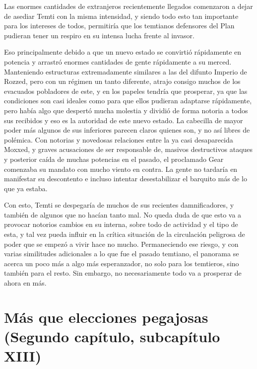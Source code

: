 \documentclass[
  spanish,
]{book}
\begin{document}
Las enormes cantidades de extranjeros recientemente llegados comenzaron a dejar de asediar Temti con la misma intensidad, y siendo todo esto tan importante para los intereses de todos, permitiría que los temtianos defensores del Plan pudieran tener un respiro en su intensa lucha frente al invasor.

Eso principalmente debido a que un nuevo estado se convirtió rápidamente en potencia y arrastró enormes cantidades de gente rápidamente a su merced. Manteniendo estructuras extremadamente similares a las del difunto Imperio de Rozzed, pero con un régimen un tanto diferente, atrajo consigo muchos de los evacuados pobladores de este, y en los papeles tendría que prosperar, ya que las condiciones son casi ideales como para que ellos pudieran adaptarse rápidamente, pero había algo que despertó mucha molestia y dividió de forma notoria a todos sus recibidos y eso es la autoridad de este nuevo estado. La cabecilla de mayor poder más algunos de sus inferiores parecen claros quienes son, y no así libres de polémica. Con notorias y novedosas relaciones entre la ya casi desaparecida Moxxed, y graves acusaciones de ser responsable de, masivos destructivos ataques y posterior caída de muchas potencias en el pasado, el proclamado Gear comenzaba su mandato con mucho viento en contra. La gente no tardaría en manifestar su descontento e incluso intentar desestabilizar el barquito más de lo que ya estaba.

Con esto, Temti se despegaría de muchos de sus recientes damnificadores, y también de algunos que no hacían tanto mal. No queda duda de que esto va a provocar notorios cambios en su interna, sobre todo de actividad y el tipo de esta, y tal vez pueda influir en la crítica situación de la circulación peligrosa de poder que se empezó a vivir hace no mucho. Permaneciendo ese riesgo, y con varias similitudes adicionales a lo que fue el pasado temtiano, el panorama se acerca un poco más a algo más esperanzador, no solo para los temtieros, sino también para el resto. Sin embargo, no necesariamente todo va a prosperar de ahora en más.

\hypertarget{muxe1s-que-elecciones-pegajosas-segundo-capuxedtulo-subcapuxedtulo-xiii}{%
\section{Más que elecciones pegajosas (Segundo capítulo, subcapítulo XIII)}\label{muxe1s-que-elecciones-pegajosas-segundo-capuxedtulo-subcapuxedtulo-xiii}}
\end{document}
